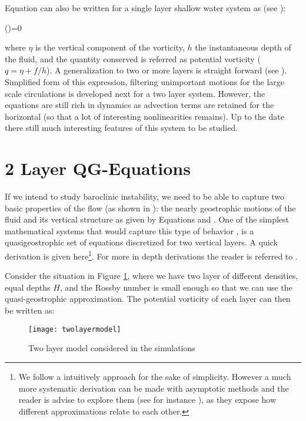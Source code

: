 Equation  can also be written for a single layer shallow water system as (see ):

\beq
{}\left(\right)=0

where $\eta$ is the vertical component of the vorticity, $h$ the instantaneous depth of the fluid, and the quantity conserved is referred as potential vorticity ($q=\eta + f/h$). A generalization to two or  more layers is straight forward (see ).  Simplified form of this
expression, filtering unimportant motions for the large scale circulations
is developed next for a two layer system. However, the equations are
still rich in dynamics as advection terms are retained for the horizontal
(so that a lot of interesting nonlinearities remains). Up to the date
there still much interesting features of this system to be studied.




\section{2 Layer QG-Equations}
\label{s:qg}
If we intend to study baroclinic instability, we need to be able to
capture two basic properties of the flow (as shown in
): the nearly geostrophic motions of the fluid and its vertical
structure as given by Equations  and . One of the simplest mathematical systems that would capture
this type of behavior , is a quasigeostrophic set of equations discretized
for two vertical layers. A quick derivation is given here\footnote{We follow a intuitively approach for the sake of simplicity. However a much more systematic derivation can be made with asymptotic methods and the reader is advise to explore them (see for instance ), as they expose how different approximations relate to each other.}. For more in
depth derivations the  reader is referred to
.

Consider the situation in Figure \ref{f:twolayer}, where we have two layer of different densities, equal depths $H$, and the Rossby number is small enough so that we can use the quasi-geostrophic approximation. The potential vorticity of each layer can then be written as:
\begin{figure}[t]
\begin{center}
    \texttt{[image: twolayermodel]}
\end{center}
\caption{Two layer model considered in the simulations}
\label{f:twolayer}
\end{figure}

